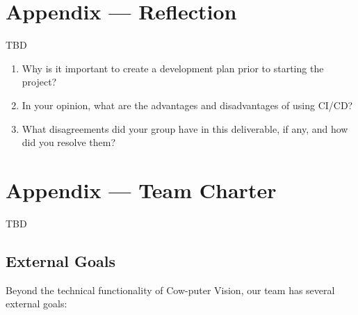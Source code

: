 \documentclass{article}
\newcommand{\progname}{Cow-puter Vision} %
\begin{document}
\newpage{}

\section*{Appendix --- Reflection}
{\color{red} TBD}




\begin{enumerate}
    \item Why is it important to create a development plan prior to starting the
    project?
    \item In your opinion, what are the advantages and disadvantages of using
    CI/CD?
    \item What disagreements did your group have in this deliverable, if any,
    and how did you resolve them?
\end{enumerate}

\newpage{}

\section*{Appendix --- Team Charter}
{\color{red} TBD}

\subsection*{External Goals}

Beyond the technical functionality of \progname{}, our team has several external goals:
\end{document}
